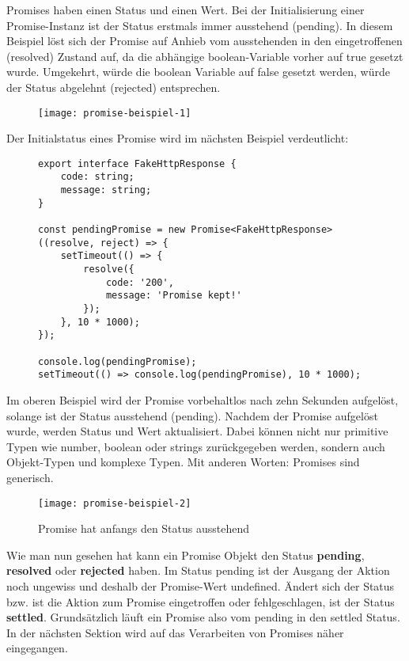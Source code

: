 \noindent
Promises haben einen Status und einen Wert. Bei der Initialisierung einer Promise-Instanz ist der Status erstmals immer ausstehend (pending). In diesem Beispiel löst sich der Promise auf Anhieb vom ausstehenden in den eingetroffenen (resolved) Zustand auf, da die abhängige boolean-Variable vorher auf true gesetzt wurde. Umgekehrt, würde die boolean Variable auf false gesetzt werden, würde der Status abgelehnt (rejected) entsprechen.

\begin{figure}[H]
\centering
\texttt{[image: promise-beispiel-1]}
\caption{}
\end{figure}

\noindent
Der Initialstatus eines Promise wird im nächsten Beispiel verdeutlicht:

\begin{figure}[H]
\begin{lstlisting}[basicstyle=\small]
export interface FakeHttpResponse {
    code: string;
    message: string;
}

const pendingPromise = new Promise<FakeHttpResponse>((resolve, reject) => {
    setTimeout(() => {
        resolve({
            code: '200',
            message: 'Promise kept!'
        });
    }, 10 * 1000);
});

console.log(pendingPromise);
setTimeout(() => console.log(pendingPromise), 10 * 1000);
\end{lstlisting}
\end{figure}

\noindent
Im oberen Beispiel wird der Promise vorbehaltlos nach zehn Sekunden aufgelöst, solange ist der Status ausstehend (pending). Nachdem der Promise aufgelöst wurde, werden Status und Wert aktualisiert. Dabei können nicht nur primitive Typen wie number, boolean oder strings zurückgegeben werden, sondern auch Objekt-Typen und komplexe Typen. Mit anderen Worten: Promises sind generisch.

\begin{figure}[H]
\centering
\texttt{[image: promise-beispiel-2]}
\caption{Promise hat anfangs den Status \glqq{}ausstehend\grqq{}}
\end{figure}

\noindent
Wie man nun gesehen hat kann ein Promise Objekt den Status \textbf{pending}, \textbf{resolved} oder \textbf{rejected} haben. Im Status pending ist der Ausgang der Aktion noch ungewiss und deshalb der Promise-Wert undefined. Ändert sich der Status bzw. ist die Aktion zum Promise eingetroffen oder fehlgeschlagen, ist der Status \textbf{settled}. Grundsätzlich läuft ein Promise also vom pending in den settled Status. In der nächsten Sektion wird auf das Verarbeiten von Promises näher eingegangen.

